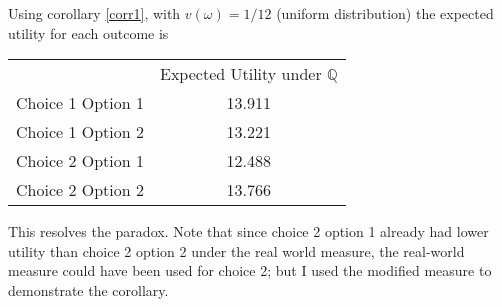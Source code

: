 \documentclass{article}
\begin{document}
Using corollary \ref{corr1}, with \(v(\omega)=1/12\) (uniform distribution) the expected utility for each outcome is 

\begin{center} 
	\begin{tabular}{c c}
		& Expected Utility under \(\mathbb{Q}\) \\
		Choice 1 Option 1 & 13.911 \\
		Choice 1 Option 2 & 13.221 \\
		Choice 2 Option 1 & 12.488 \\
		Choice 2 Option 2 & 13.766 \\
	\end{tabular}
\end{center}

This resolves the paradox.  Note that since choice 2 option 1 already had lower utility than choice 2 option 2 under the real world measure, the real-world measure could have been used for choice 2; but I used the modified measure to demonstrate the corollary.  
	
\end{document}
